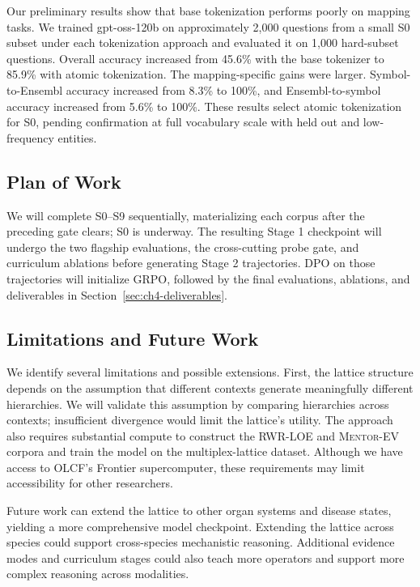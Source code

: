 \documentclass[thesis,letterpaper,12pt]{utthesis}
\begin{document}
Our preliminary results show that base tokenization performs poorly on mapping tasks. We trained gpt-oss-120b on approximately 2,000 questions from a small S0 subset under each tokenization approach and evaluated it on 1,000 hard-subset questions. Overall accuracy increased from 45.6\% with the base tokenizer to 85.9\% with atomic tokenization. The mapping-specific gains were larger. Symbol-to-Ensembl accuracy increased from 8.3\% to 100\%, and Ensembl-to-symbol accuracy increased from 5.6\% to 100\%. These results select atomic tokenization for S0, pending confirmation at full vocabulary scale with held out and low-frequency entities.

\subsection{Plan of Work}\label{sec:ch4-plan}
We will complete S0--S9 sequentially, materializing each corpus after the preceding gate clears; S0 is underway. The resulting Stage 1 checkpoint will undergo the two flagship evaluations, the cross-cutting probe gate, and curriculum ablations before generating Stage 2 trajectories. DPO on those trajectories will initialize GRPO, followed by the final evaluations, ablations, and deliverables in Section~\ref{sec:ch4-deliverables}.

\subsection{Limitations and Future Work}\label{sec:ch4-limits}
We identify several limitations and possible extensions. First, the lattice structure depends on the assumption that different contexts generate meaningfully different hierarchies. We will validate this assumption by comparing hierarchies across contexts; insufficient divergence would limit the lattice's utility. The approach also requires substantial compute to construct the RWR-LOE and \textsc{Mentor-EV} corpora and train the model on the multiplex-lattice dataset. Although we have access to OLCF's Frontier supercomputer, these requirements may limit accessibility for other researchers.

Future work can extend the lattice to other organ systems and disease states, yielding a more comprehensive model checkpoint. Extending the lattice across species could support cross-species mechanistic reasoning. Additional evidence modes and curriculum stages could also teach more operators and support more complex reasoning across modalities.

\printbibliography
\end{document}
